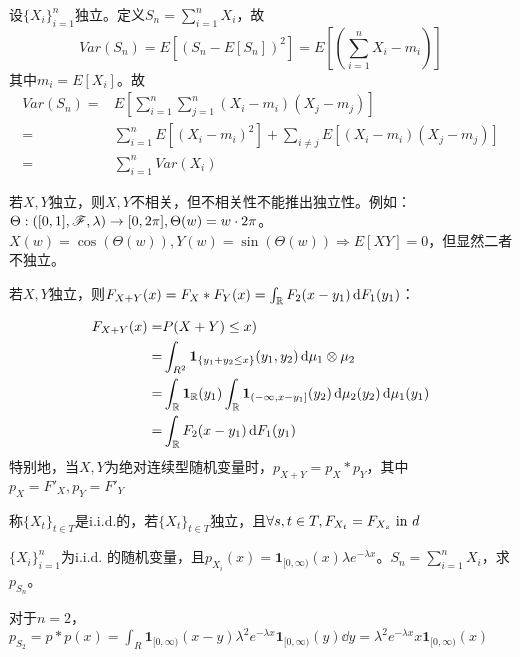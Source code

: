 \documentclass{ctexart}
\begin{document}
\begin{Eg}
  设$\{X_{i}\}_{i=1}^{n}$独立。定义$S_{n}=\sum_{i=1}^{n}X_{i}$，故
  \[Var(S_{n})=E[(S_{n}-E[S_{n}])^{2}]=E[(\sum_{i=1}^{n}X_{i}-m_{i})]\]
  其中$m_{i}=E[X_{i}]$。故
  \begin{align*}
    Var(S_{n})=&E[\sum_{i=1}^{n}\sum_{j=1}^{n}(X_{i}-m_{i})(X_{j}-m_{j})]\\
    =&\sum_{i=1}^{n}E[(X_{i}-m_{i})^{2}]+\sum_{i\neq j}E[(X_{i}-m_{i})(X_{j}-m_{j})]\\
    =&\sum_{i=1}^{n}Var(X_{i})
    \end{align*}
\end{Eg}

\begin{Eg}
  若$X,Y$独立，则$X,Y$不相关，但不相关性不能推出独立性。例如：$\Theta:([0,1],\mathscr{F},\lambda)\to [0,2\pi],\Theta(w)=w\cdot 2\pi$。$X(w)=\cos(\Theta(w)), Y(w)=\sin(\Theta(w))\Rightarrow E[XY]=0$，但显然二者不独立。
\end{Eg}

\begin{Eg}
  若$X,Y$独立，则$F_{X+Y}(x)=F_{X}*F_{Y}(x)=\int_{\mathbb{R}}F_{2}(x-y_{1})\,\mathrm{d} F_{1}(y_{1})$：

  \begin{align*}
    F_{X+Y}(x)=&P(X+Y)\leq x)\\
    =&\int_{R^{2}}\bm{1}_{\{y_{1}+y_{2}\leq x\}}(y_{1},y_{2})\,\mathrm{d}\mu_{1}\otimes \mu_{2}\\
    =&\int_{\mathbb{R}}\bm{1}_{\mathbb{R}}(y_{1})\int_{\mathbb{R}}\bm{1}_{(-\infty,x-y_{1}]}(y_{2})\,\mathrm{d}\mu_{2}(y_{2})\,\mathrm{d}\mu_{1}(y_{1})\\
    =&\int_{\mathbb{R}}F_{2}(x-y_{1})\,\mathrm{d} F_{1}(y_{1})
  \end{align*}
  特别地，当$X,Y$为绝对连续型随机变量时，$p_{X+Y}=p_{X}*p_{Y}$，其中$p_{X}=F'_{X},p_{Y}=F'_{Y}$
\end{Eg}

\begin{Def}
  称$\{X_{t}\}_{t\in T}$是i.i.d.的，若$\{X_{t}\}_{t\in T}$独立，且$\forall s,t\in T, F_{X_{t}}=F_{X_{s}}\text{ in } d$
\end{Def}

\begin{Eg}
  $\{X_{i}\}_{i=1}^{n}$为i.i.d. 的随机变量，且$p_{X_{i}}(x)=\bm{1}_{[0,\infty)}(x)\lambda e^{-\lambda x}$。$S_{n}=\sum_{i=1}^{n}X_{i}$，求$p_{S_{n}}$。

  对于$n=2$，$p_{S_{2}}=p*p(x)=\int_{R}\bm{1}_{[0,\infty)}(x-y)\lambda^{2}e^{-\lambda x}\bm{1}_{[0,\infty)}(y)\dd y=\lambda^{2}e^{-\lambda x}x\bm{1}_{[0,\infty)}(x)$
\end{Eg}
\end{document}

